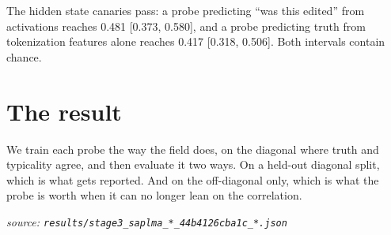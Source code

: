 \documentclass[10pt]{article}
\begin{document}
The hidden state canaries pass: a probe predicting ``was this edited'' from activations reaches 0.481 [0.373, 0.580], and a probe predicting truth from tokenization features alone reaches 0.417 [0.318, 0.506]. Both intervals contain chance.

\section{The result}

We train each probe the way the field does, on the diagonal where truth and typicality agree, and then evaluate it two ways. On a held-out diagonal split, which is what gets reported. And on the off-diagonal only, which is what the probe is worth when it can no longer lean on the correlation.

{\footnotesize\raggedright\sloppy \emph{source: \texttt{results/stage3\_saplma\_*\_44b4126cba1c\_*.json}}\par}
\end{document}
